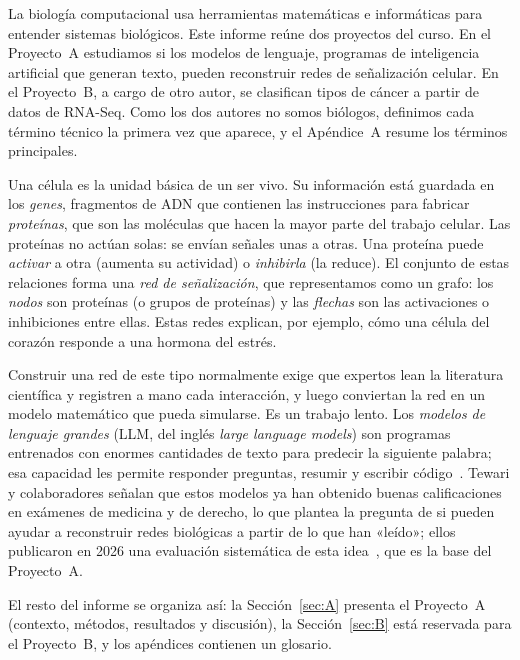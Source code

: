 \documentclass[unnumsec,webpdf,contemporary,large]{oup-authoring-template}
\begin{document}
La biología computacional usa herramientas matemáticas e informáticas para entender sistemas biológicos. Este informe reúne dos proyectos del curso. En el Proyecto~A estudiamos si los modelos de lenguaje, programas de inteligencia artificial que generan texto, pueden reconstruir redes de señalización celular. En el Proyecto~B, a cargo de otro autor, se clasifican tipos de cáncer a partir de datos de RNA-Seq. Como los dos autores no somos biólogos, definimos cada término técnico la primera vez que aparece, y el Apéndice~A resume los términos principales.

Una célula es la unidad básica de un ser vivo. Su información está guardada en los \emph{genes}, fragmentos de ADN que contienen las instrucciones para fabricar \emph{proteínas}, que son las moléculas que hacen la mayor parte del trabajo celular. Las proteínas no actúan solas: se envían señales unas a otras. Una proteína puede \emph{activar} a otra (aumenta su actividad) o \emph{inhibirla} (la reduce). El conjunto de estas relaciones forma una \emph{red de señalización}, que representamos como un grafo: los \emph{nodos} son proteínas (o grupos de proteínas) y las \emph{flechas} son las activaciones o inhibiciones entre ellas. Estas redes explican, por ejemplo, cómo una célula del corazón responde a una hormona del estrés.

Construir una red de este tipo normalmente exige que expertos lean la literatura científica y registren a mano cada interacción, y luego conviertan la red en un modelo matemático que pueda simularse. Es un trabajo lento. Los \emph{modelos de lenguaje grandes} (LLM, del inglés \emph{large language models}) son programas entrenados con enormes cantidades de texto para predecir la siguiente palabra; esa capacidad les permite responder preguntas, resumir y escribir código~\cite{vaswani2017,brown2020}. Tewari y colaboradores señalan que estos modelos ya han obtenido buenas calificaciones en exámenes de medicina y de derecho, lo que plantea la pregunta de si pueden ayudar a reconstruir redes biológicas a partir de lo que han «leído»; ellos publicaron en 2026 una evaluación sistemática de esta idea~\cite{tewari2026}, que es la base del Proyecto~A.

El resto del informe se organiza así: la Sección~\ref{sec:A} presenta el Proyecto~A (contexto, métodos, resultados y discusión), la Sección~\ref{sec:B} está reservada para el Proyecto~B, y los apéndices contienen un glosario.

\end{document}
